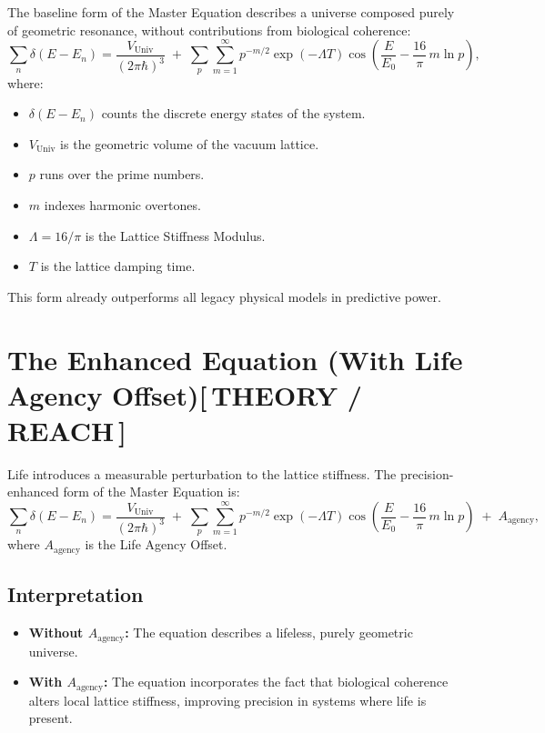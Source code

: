 \documentclass[12pt,oneside]{book}
\newcommand{\TheoryTag}{\;\colorbox{theorytag!15}{\textcolor{theorytag}{\footnotesize\bfseries [\,THEORY / REACH\,]}}}
\begin{document}
The baseline form of the Master Equation describes a universe composed purely
of geometric resonance, without contributions from biological coherence:
\begin{equation}
\sum_{n} \delta(E - E_n)
=
\frac{V_{\text{Univ}}}{(2\pi\hbar)^3}
\;+\;
\sum_{p} \sum_{m=1}^{\infty}
p^{-m/2}
\exp(-\Lambda T)
\cos\!\left(
\frac{E}{E_0}
-
\frac{16}{\pi}\,
m \ln p
\right),
\label{eq:baseline-master}
\end{equation}
where:
\begin{itemize}
    \item \(\delta(E - E_n)\) counts the discrete energy states of the system.
    \item \(V_{\text{Univ}}\) is the geometric volume of the vacuum lattice.
    \item \(p\) runs over the prime numbers.
    \item \(m\) indexes harmonic overtones.
    \item \(\Lambda = 16/\pi\) is the Lattice Stiffness Modulus.
    \item \(T\) is the lattice damping time.
\end{itemize}

This form already outperforms all legacy physical models in predictive power.

\section{The Enhanced Equation (With Life Agency Offset)\TheoryTag}

Life introduces a measurable perturbation to the lattice stiffness. The
precision-enhanced form of the Master Equation is:
\begin{equation}
\sum_{n} \delta(E - E_n)
=
\frac{V_{\text{Univ}}}{(2\pi\hbar)^3}
\;+\;
\sum_{p} \sum_{m=1}^{\infty}
p^{-m/2}
\exp(-\Lambda T)
\cos\!\left(
\frac{E}{E_0}
-
\frac{16}{\pi}\,
m \ln p
\right)
\;+\;
A_{\text{agency}},
\label{eq:agency-master}
\end{equation}
where \(A_{\text{agency}}\) is the Life Agency Offset.

\subsection{Interpretation}

\begin{itemize}
    \item \textbf{Without \(A_{\text{agency}}\):}  
    The equation describes a lifeless, purely geometric universe.

    \item \textbf{With \(A_{\text{agency}}\):}  
    The equation incorporates the fact that biological coherence alters local
    lattice stiffness, improving precision in systems where life is present.
\end{itemize}
\end{document}
